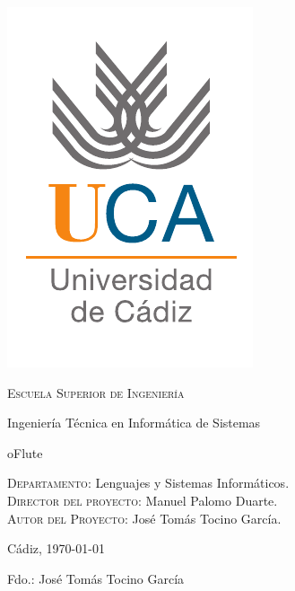 \documentclass[a4paper,12pt,titlepage,halfparskip,cleardoubleempty]{scrbook}
\begin{document}
{
  \thispagestyle{empty}
  \centering
  \includegraphics[width=.2\textwidth]{logo_uca}

  \bigskip
  \bigskip
  \bigskip
  
  \begin{changemargin}{3em}{3em}

    \begin{center}
      {\Huge \textsc{\nohyphens{Escuela Superior de Ingeniería}}}
      
      \bigskip
      \bigskip
      
      {\huge \nohyphens{Ingeniería Técnica en Informática de Sistemas}}
      
      \bigskip
      \bigskip
      \bigskip
      \bigskip
      
      {\LARGE \nohyphens{oFlute}}
      
      \bigskip
      \bigskip
      \bigskip
      \bigskip
      
    \end{center}
  \end{changemargin}

  \begin{flushleft}
    \Large

    \textsc{Departamento}: \nohyphens{Lenguajes y Sistemas Informáticos.} \\
    \textsc{Director del proyecto}: \nohyphens{Manuel Palomo Duarte.} \\
    \textsc{Autor del Proyecto}: \nohyphens{José Tomás Tocino García}. \\
  \end{flushleft}
  
  \bigskip
  \bigskip
  \bigskip
  
  \begin{flushright}
    \large
    Cádiz, \today
    
    Fdo.: José Tomás Tocino García
    
  \end{flushright}

}

\bigskip
\bigskip
\bigskip
\bigskip
\end{document}
